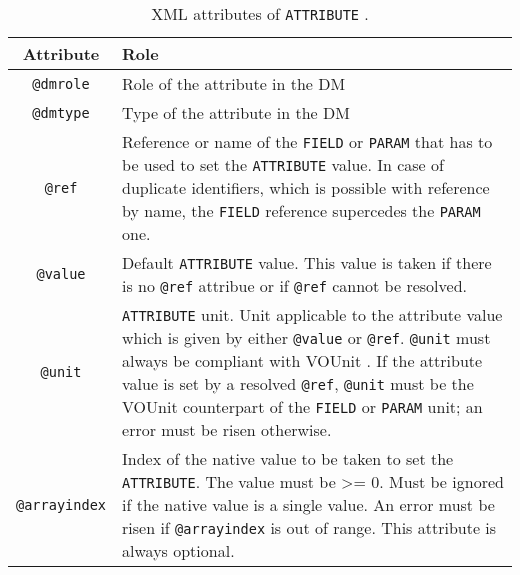 \begin{table}[!htbp]
\small
\centering
\begin{tabulary}{\linewidth}{|c|J|}       
       \hline 
            \textbf{Attribute} & 
            \textbf {Role}\\
       \hline         \hline  
            \texttt{@dmrole} & 
            Role of the attribute in the DM\\
        \hline 
            \texttt{@dmtype} & 
            Type of the attribute in the DM\\
        \hline 
            \texttt{@ref} & 
            Reference or name of the \texttt{FIELD} or \texttt{PARAM} that has to be used to set the 
            \texttt{ATTRIBUTE} value. In case of duplicate identifiers, which is possible with reference by name, 
            the \texttt{FIELD} reference supercedes the \texttt{PARAM} one. \\
        \hline 
            \texttt{@value}  &
            Default \texttt{ATTRIBUTE} value. This value is taken if there is no 
            \texttt{@ref} attribue or if \texttt{@ref} cannot be resolved.\\
        \hline 
            \texttt{@unit} & 
            \texttt{ATTRIBUTE} unit. Unit applicable to the attribute value which is given 
            by either \texttt{@value} or \texttt{@ref}. \texttt{@unit} must always 
            be compliant with VOUnit \citep{2014ivoa.spec.0523D}. 
            If the attribute value is set by a resolved \texttt{@ref}, 
            \texttt{@unit} must be the VOUnit counterpart of the \texttt{FIELD} or \texttt{PARAM} unit;
            an error must be risen otherwise.\\
        \hline 
            \texttt{@arrayindex} & 
            Index of the native value to be taken to set the \texttt{ATTRIBUTE}. 
            The value must be >= 0.
            Must be ignored if the native value is a single value. 
            An error must be risen if \texttt{@arrayindex} is out of range.
            This attribute is always optional.\\
        \hline 
     \end{tabulary}
     \caption{XML attributes of  \texttt{ATTRIBUTE} .} 
     \label{tbl:attribute-att}
 \end{table}


